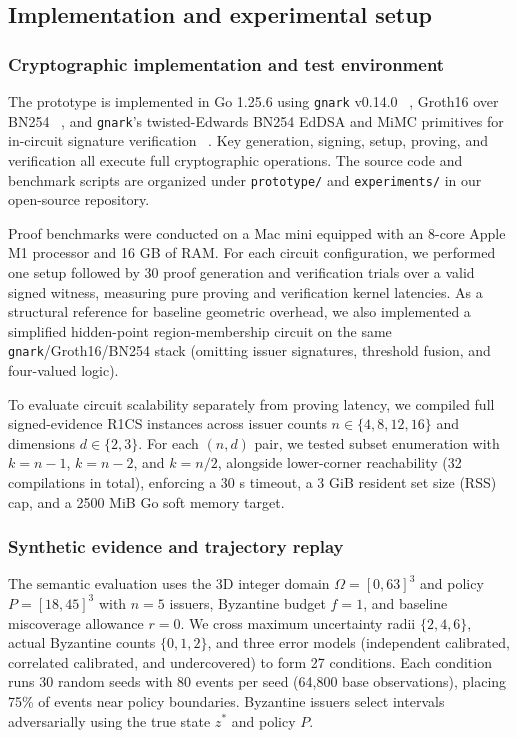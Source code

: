\documentclass[pdflatex,iicol,sn-mathphys-num]{sn-jnl}
\theoremstyle{thmstyleone}
\begin{document}
\subsection{Implementation and experimental setup}
\subsubsection{Cryptographic implementation and test environment}
The prototype is implemented in Go 1.25.6 using \texttt{gnark} v0.14.0 ~\citep{gnark}, Groth16 over BN254 ~\citep{Groth2016}, and \texttt{gnark}'s twisted-Edwards BN254 EdDSA and MiMC primitives for in-circuit signature verification ~\citep{MiMC2016}. Key generation, signing, setup, proving, and verification all execute full cryptographic operations. The source code and benchmark scripts are organized under \texttt{prototype/} and \texttt{experiments/} in our open-source repository.

Proof benchmarks were conducted on a Mac mini equipped with an 8-core Apple M1 processor and 16 GB of RAM. For each circuit configuration, we performed one setup followed by 30 proof generation and verification trials over a valid signed witness, measuring pure proving and verification kernel latencies. As a structural reference for baseline geometric overhead, we also implemented a simplified hidden-point region-membership circuit on the same \texttt{gnark}/Groth16/BN254 stack (omitting issuer signatures, threshold fusion, and four-valued logic).

To evaluate circuit scalability separately from proving latency, we compiled full signed-evidence R1CS instances across issuer counts $n \in \{4, 8, 12, 16\}$ and dimensions $d \in \{2, 3\}$. For each $(n, d)$ pair, we tested subset enumeration with $k = n - 1$, $k = n - 2$, and $k = n/2$, alongside lower-corner reachability (32 compilations in total), enforcing a 30 s timeout, a 3 GiB resident set size (RSS) cap, and a 2500 MiB Go soft memory target.

\subsubsection{Synthetic evidence and trajectory replay}
The semantic evaluation uses the 3D integer domain $\Omega = [0, 63]^3$ and policy $P = [18, 45]^3$ with $n = 5$ issuers, Byzantine budget $f = 1$, and baseline miscoverage allowance $r = 0$. We cross maximum uncertainty radii $\{2, 4, 6\}$, actual Byzantine counts $\{0, 1, 2\}$, and three error models (independent calibrated, correlated calibrated, and undercovered) to form 27 conditions. Each condition runs 30 random seeds with 80 events per seed (64,800 base observations), placing 75\% of events near policy boundaries. Byzantine issuers select intervals adversarially using the true state $z^*$ and policy $P$.
\end{document}
